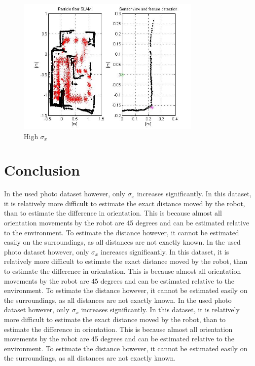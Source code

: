 \documentclass[12pt]{article}
\begin{document}
\begin{figure}[H]
	\centering
	\includegraphics[width=0.8\textwidth]{own_very_high_sigma.jpg}
	\caption{High $\sigma_x$}
\end{figure}

\section{Conclusion}
In the used photo dataset however, only $\sigma_x$ increases significantly. In this dataset, it is relatively more difficult to estimate the exact distance moved by the robot, than to estimate the difference in orientation. This is because almost all orientation movements by the robot are 45 degrees and can be estimated relative to the environment. To estimate the distance however, it cannot be estimated easily on the surroundings, as all distances are not exactly known.
In the used photo dataset however, only $\sigma_x$ increases significantly. In this dataset, it is relatively more difficult to estimate the exact distance moved by the robot, than to estimate the difference in orientation. This is because almost all orientation movements by the robot are 45 degrees and can be estimated relative to the environment. To estimate the distance however, it cannot be estimated easily on the surroundings, as all distances are not exactly known.
In the used photo dataset however, only $\sigma_x$ increases significantly. In this dataset, it is relatively more difficult to estimate the exact distance moved by the robot, than to estimate the difference in orientation. This is because almost all orientation movements by the robot are 45 degrees and can be estimated relative to the environment. To estimate the distance however, it cannot be estimated easily on the surroundings, as all distances are not exactly known.
\end{document}
